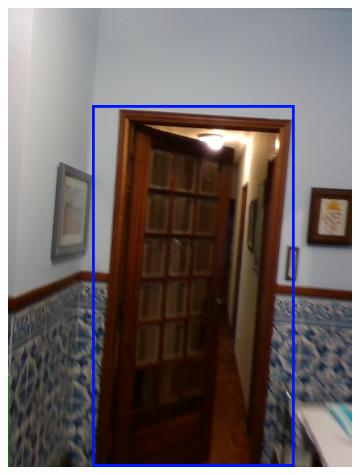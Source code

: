 \begin{figure}[h!]
\begin{subfigure}[b]{0.21\linewidth}
		\includegraphics[width=\linewidth]{images/deep_doors_2_semiopen.png}
		\caption{}
	\end{subfigure}
	\hfil
	\begin{subfigure}[b]{0.21\linewidth}

\end{subfigure}
\end{figure}
